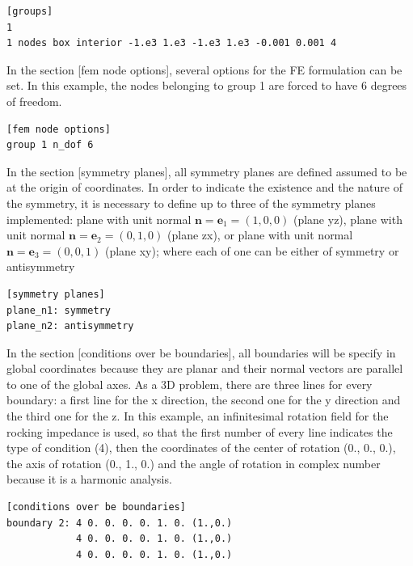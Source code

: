 \documentclass[a4]{article}
\begin{document}
\begin{Verbatim}
[groups]
1
1 nodes box interior -1.e3 1.e3 -1.e3 1.e3 -0.001 0.001 4 
\end{Verbatim}

In the section [fem node options], several options for the FE formulation can be set. In this example, the nodes belonging to group 1 are forced to have 6 degrees of freedom.  

\begin{Verbatim}
[fem node options]
group 1 n_dof 6
\end{Verbatim}

In the section [symmetry planes], all symmetry planes are defined assumed to be at the origin of coordinates. In order to indicate the existence and the nature of the symmetry, it is necessary to define up to three of the symmetry planes implemented: plane with unit normal $ \textbf{n} = \textbf{e}_1 = (1, 0, 0) $ (plane yz), plane with unit normal $ \textbf{n} = \textbf{e}_2 = (0, 1, 0) $ (plane zx), or plane with unit normal $ \textbf{n} = \textbf{e}_3 = (0, 0, 1) $ (plane xy); where each of one can be either of symmetry or antisymmetry

\begin{Verbatim}
[symmetry planes]
plane_n1: symmetry
plane_n2: antisymmetry
\end{Verbatim}

In the section [conditions over be boundaries], all boundaries will be specify in global coordinates because they are planar and their normal vectors are parallel to one of the global axes. As a 3D problem, there are three lines for every boundary: a first line for the x direction, the second one for the y direction and the third one for the z. In this example, an infinitesimal rotation field for the rocking impedance is used, so that the first number of every line indicates the type of condition (4), then the coordinates of the center of rotation (0., 0., 0.), the axis of rotation (0., 1., 0.) and the angle of rotation in complex number because it is a harmonic analysis.

\begin{Verbatim}
[conditions over be boundaries]
boundary 2: 4 0. 0. 0. 0. 1. 0. (1.,0.)
            4 0. 0. 0. 0. 1. 0. (1.,0.)
            4 0. 0. 0. 0. 1. 0. (1.,0.)
\end{Verbatim}
\end{document}
